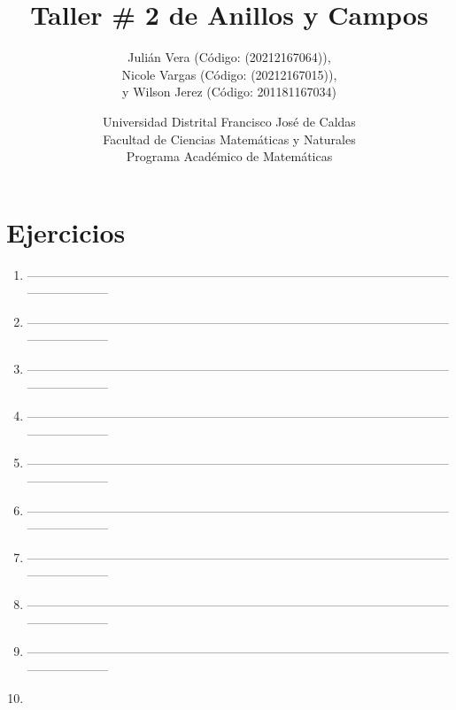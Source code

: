 \documentclass[12pt]{article}
\title{Taller \# 2 de Anillos y Campos}
\author{
    Julián Vera (Código: (20212167064)), \\
    Nicole Vargas (Código: (20212167015)), \\
    y Wilson Jerez (Código: 201181167034)
}
\date{
    Universidad Distrital Francisco José de Caldas \\
    Facultad de Ciencias Matemáticas y Naturales \\
    Programa Académico de Matemáticas
}
\theoremstyle{definition}
\theoremstyle{remark}
\begin{document}
\maketitle

\section*{Ejercicios}

\begin{enumerate}
    \item 
--------------------------------------------------------------------------------------------------------------------------
    \item 
--------------------------------------------------------------------------------------------------------------------------
    \item 
    
--------------------------------------------------------------------------------------------------------------------------
    \item 
    
--------------------------------------------------------------------------------------------------------------------------
    \item 

--------------------------------------------------------------------------------------------------------------------------
    \item 
    
--------------------------------------------------------------------------------------------------------------------------
    \item 
    
--------------------------------------------------------------------------------------------------------------------------
    \item 
    
--------------------------------------------------------------------------------------------------------------------------

    \item 
--------------------------------------------------------------------------------------------------------------------------
    \item 
    

\end{enumerate}
\end{document}
